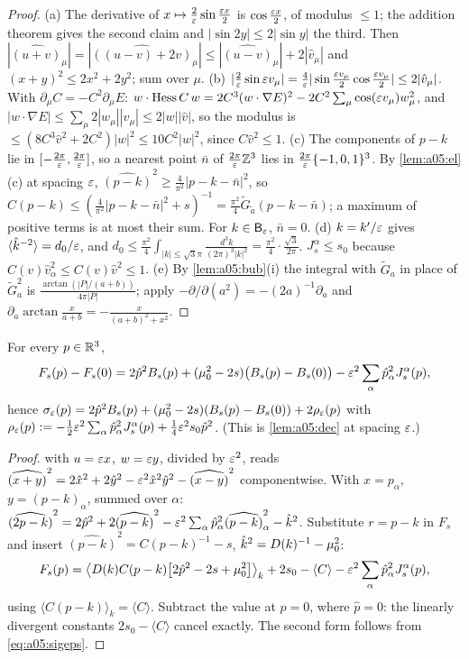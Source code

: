 \begin{proof}
(a) The derivative of $x\mapsto\frac2{\varepsilon}\sin\frac{\varepsilon x}2$ is $\cos\frac{\varepsilon x}2$, of modulus $\le1$; the addition theorem gives the second claim and $|\sin2y|\le2|\sin y|$ the third. Then $|\widehat{(u+v)}_\mu|=|\widehat{((u-v)+2v)}_\mu|\le|\widehat{(u-v)}_\mu|+2|\hat v_\mu|$ and $(x+y)^2\le2x^2+2y^2$; sum over $\mu$.
(b) $|\frac2{\varepsilon}\sin\varepsilon v_\mu|=\frac4{\varepsilon}|\sin\frac{\varepsilon v_\mu}2\cos\frac{\varepsilon v_\mu}2|\le2|\hat v_\mu|$. With $\partial_\mu C=-C^2\partial_\mu E$: $w\cdot\operatorname{Hess}C\,w=2C^3(w\cdot\nabla E)^2-2C^2\sum_\mu\cos(\varepsilon v_\mu)w_\mu^2$, and $|w\cdot\nabla E|\le\sum_\mu2|w_\mu||\hat v_\mu|\le2|w||\hat v|$, so the modulus is $\le(8C^3\hat v^2+2C^2)|w|^2\le10C^2|w|^2$, since $C\hat v^2\le1$.
(c) The components of $p-k$ lie in $[-\frac{2\pi}{\varepsilon},\frac{2\pi}{\varepsilon}]$, so a nearest point $\bar n$ of $\frac{2\pi}{\varepsilon}\mathbb Z^3$ lies in $\frac{2\pi}{\varepsilon}\{-1,0,1\}^3$. By \cref{lem:a05:el}(c) at spacing $\varepsilon$, $\widehat{(p-k)}^2\ge\frac4{\pi^2}|p-k-\bar n|^2$, so $C(p-k)\le(\frac4{\pi^2}|p-k-\bar n|^2+s)^{-1}=\frac{\pi^2}4\tilde G_{\tilde a}(p-k-\bar n)$; a maximum of positive terms is at most their sum. For $k\in\mathsf B_{\varepsilon}$, $\bar n=0$.
(d) $k=k'/\varepsilon$ gives $\langle\hat k^{-2}\rangle=d_0/\varepsilon$, and $d_0\le\frac{\pi^2}4\int_{|k|\le\sqrt3\pi}\frac{d^3k}{(2\pi)^3|k|^2}=\frac{\pi^2}4\cdot\frac{\sqrt3}{2\pi}$. $J^\alpha_s\le s_0$ because $C(v)\hat v_\alpha^2\le C(v)\hat v^2\le1$.
(e) By \cref{lem:a05:bub}(i) the integral with $\tilde G_a$ in place of $\tilde G_a^2$ is $\frac{\arctan(|P|/(a+b))}{4\pi|P|}$; apply $-\partial/\partial(a^2)=-(2a)^{-1}\partial_a$ and $\partial_a\arctan\frac x{a+b}=-\frac x{(a+b)^2+x^2}$.
\end{proof}

\begin{lemma}\label{lem:a05:Kdec}
For every $p\in\mathbb R^3$,
\[
F_s(p)-F_s(0)=2\hat p^2B_s(p)+(\mu_0^2-2s)\big(B_s(p)-B_s(0)\big)-\varepsilon^2\sum_\alpha\hat p_\alpha^2J^\alpha_s(p),
\]
hence $\sigma_{\varepsilon}(p)=2\hat p^2B_s(p)+(\mu_0^2-2s)(B_s(p)-B_s(0))+2\rho_{\varepsilon}(p)$ with $\rho_{\varepsilon}(p):=-\frac12\varepsilon^2\sum_\alpha\hat p_\alpha^2J^\alpha_s(p)+\frac14\varepsilon^2s_0\hat p^2$. (This is \cref{lem:a05:dec} at spacing $\varepsilon$.)
\end{lemma}
\begin{proof}
 with $u=\varepsilon x$, $w=\varepsilon y$, divided by $\varepsilon^2$, reads $\widehat{(x+y)}^2=2\hat x^2+2\hat y^2-\varepsilon^2\hat x^2\hat y^2-\widehat{(x-y)}^2$ componentwise. With $x=p_\alpha$, $y=(p-k)_\alpha$, summed over $\alpha$: $\widehat{(2p-k)}^2=2\hat p^2+2\widehat{(p-k)}^2-\varepsilon^2\sum_\alpha\hat p_\alpha^2\widehat{(p-k)}_\alpha^2-\hat k^2$. Substitute $r=p-k$ in $F_s$ and insert $\widehat{(p-k)}^2=C(p-k)^{-1}-s$, $\hat k^2=D(k)^{-1}-\mu_0^2$:
\[
F_s(p)=\big\langle D(k)C(p-k)\big[2\hat p^2-2s+\mu_0^2\big]\big\rangle_k+2s_0-\langle C\rangle-\varepsilon^2\sum_\alpha\hat p_\alpha^2J^\alpha_s(p),
\]
using $\langle C(p-k)\rangle_k=\langle C\rangle$. Subtract the value at $p=0$, where $\hat p=0$: the linearly divergent constants $2s_0-\langle C\rangle$ cancel exactly. The second form follows from \eqref{eq:a05:sigeps}.
\end{proof}

